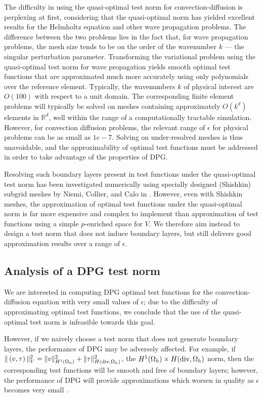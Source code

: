 The difficulty in using the quasi-optimal test norm for convection-diffusion is perplexing at first, considering that the quasi-optimal norm has yielded excellent results for the Helmholtz equation and other wave propagation problems.  The difference between the two problems lies in the fact that, for wave propagation problems, the mesh size tends to be on the order of the wavenumber $k$ --- the singular perturbation parameter. Transforming the variational problem using the quasi-optimal test norm for wave propagation yields smooth optimal test functions that are approximated much more accurately using only polynomials over the reference element. Typically, the wavenumbers $k$ of physical interest are $O(100)$ with respect to a unit domain. The corresponding finite element problems will typically be solved on meshes containing approximately $O\!\left(k^d\right)$ elements in $\mathbb{R}^d$, well within the range of a computationally tractable simulation. However, for convection diffusion problems, the relevant range of $\epsilon$ for physical problems can be as small as $1e-7$. Solving on under-resolved meshes is thus unavoidable, and the approximability of optimal test functions must be addressed in order to take advantage of the properties of DPG.

Resolving such boundary layers present in test functions under the quasi-optimal test norm has been investigated numerically using specially designed (Shishkin) subgrid meshes by Niemi, Collier, and Calo in
\cite{DBLP:journals/procedia/NiemiCC11}.  However, even with Shishkin meshes, the approximation of optimal test functions under the quasi-optimal norm is far more expensive and complex to implement than approximation of test functions using a simple $p$-enriched space for $V$. We therefore aim instead to design a test norm that does not induce boundary layers, but still delivers good approximation results over a range of $\epsilon$.  

\subsection{Analysis of a DPG test norm}
We are interested in computing DPG optimal test functions for the convection-diffusion equation with very small values of $\epsilon$; due to the difficulty of approximating optimal test functions, we conclude that the use of the quasi-optimal test norm is infeasible towards this goal. 

However, if we naively choose a test norm that does not generate boundary layers, the performance of DPG may be adversely affected. For example, if $\|\left(v,\tau\right)\|_V^2 = \|v\|_{H^1(\Omega_h)}^2 + \|\tau\|^2_{H({\rm div},\Omega_h)}$, the $H^1(\Omega_h)\times H({\rm div},\Omega_h)$ norm, then the corresponding test functions will be smooth and free of boundary layers; however, the performance of DPG will provide approximations which worsen in quality as $\epsilon$ becomes very small \cite{DPG3,DPGrobustness}. 

